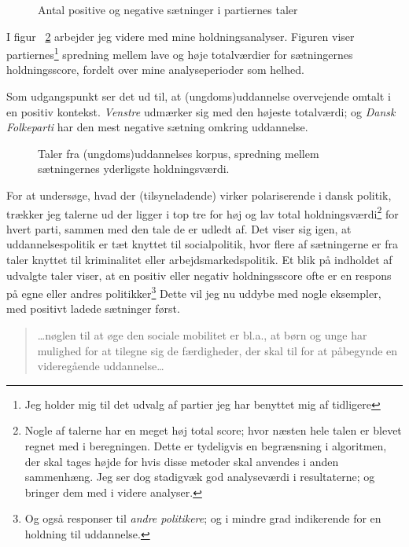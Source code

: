 \begin{figure}
\begin{adjustwidth}{-1.5in}{-1in}
 
\end{adjustwidth}
\caption{Antal positive og negative sætninger i partiernes taler}
\label{fig:sentcount}
\end{figure}

I figur ~\ref{fig:sent_minmax} arbejder jeg videre med mine holdningsanalyser. Figuren viser partiernes\footnote{
Jeg holder mig til det udvalg af partier jeg har benyttet mig af tidligere}
spredning mellem lave og høje totalværdier for sætningernes holdningsscore, fordelt over mine analyseperioder som helhed.

Som udgangspunkt ser det ud til, at (ungdoms)uddannelse overvejende omtalt i en positiv kontekst.
\textit{Venstre} udmærker sig med den højeste totalværdi; og \textit{Dansk Folkeparti} har den mest negative sætning omkring uddannelse.

\begin{figure}
  
 \caption{Taler fra (ungdoms)uddannelses korpus, spredning mellem sætningernes yderligste holdningsværdi.}
\label{fig:sent_minmax}
\end{figure}

For at undersøge, hvad der (tilsyneladende) virker polariserende i dansk politik, trækker jeg talerne ud der ligger i top tre for høj og lav total holdningsværdi\footnote{Nogle af talerne har en meget høj total score; hvor næsten hele talen er blevet regnet med i beregningen. Dette er tydeligvis en begrænsning i algoritmen, der skal tages højde for hvis disse metoder skal anvendes i anden sammenhæng. Jeg ser dog stadigvæk god analyseværdi i resultaterne; og bringer dem med i videre analyser.} for hvert parti, sammen med den tale de er udledt af.
Det viser sig igen, at uddannelsespolitik er tæt knyttet til socialpolitik, hvor flere af sætningerne er fra taler knyttet til kriminalitet eller arbejdsmarkedspolitik.
Et blik på indholdet af udvalgte taler viser, at en positiv eller negativ holdningsscore ofte er en respons på egne eller andres politikker\footnote{Og også responser til \textit{andre politikere}; og i mindre grad indikerende for en holdning til uddannelse.}
Dette vil jeg nu uddybe med nogle eksempler, med positivt ladede sætninger først.

\begin{quotation}
\ldots nøglen til at øge den sociale mobilitet er bl.a., at børn og unge har mulighed for at tilegne sig de færdigheder, der skal til for at påbegynde en videregående uddannelse\ldots
{}
\end{quotation}

